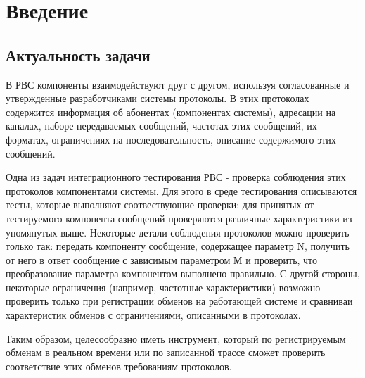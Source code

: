 \section{Введение}

\subsection{Актуальность задачи}

В РВС компоненты взаимодействуют друг с другом, используя согласованные и 
утвержденные разработчиками системы протоколы. В этих протоколах содержится 
информация об абонентах (компонентах системы), адресации на каналах, наборе 
передаваемых сообщений, частотах этих сообщений, их форматах, ограничениях на 
последовательность, описание содержимого этих сообщений.

Одна из задач интеграционного тестирования РВС - проверка соблюдения этих 
протоколов компонентами системы. Для этого в среде тестирования описываются 
тесты, которые выполняют соотвествующие проверки: для принятых от тестируемого 
компонента сообщений проверяются различные характеристики из упомянутых выше. 
Некоторые детали соблюдения протоколов можно проверить только так: передать 
компоненту сообщение, содержащее параметр N, получить от него в ответ сообщение 
с зависимым параметром М и проверить, что преобразование параметра компонентом 
выполнено правильно. С другой стороны, некоторые ограничения (например, 
частотные характеристики) возможно проверить только при регистрации обменов на 
работающей системе и сравниваи характеристик обменов с ограничениями, описанными 
в протоколах.

Таким образом, целесообразно иметь инструмент, который по регистрируемым обменам 
в реальном времени или по записанной трассе сможет проверить соответствие этих 
обменов требованиям протоколов.
